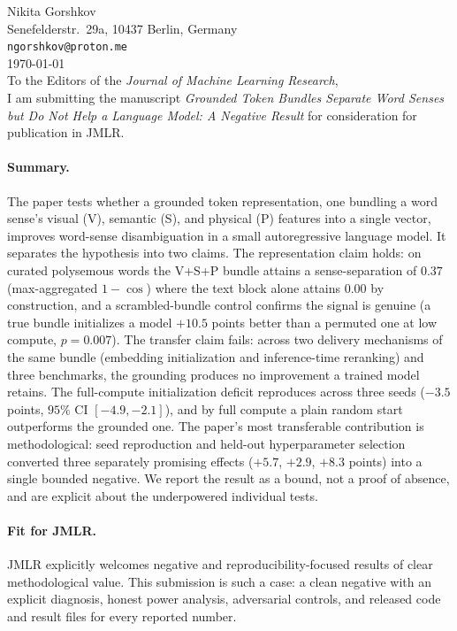 \documentclass[11pt]{article}
\begin{document}
\thispagestyle{empty}

\noindent Nikita Gorshkov\\
Senefelderstr.\ 29a, 10437 Berlin, Germany\\
\texttt{ngorshkov@proton.me}\\[1em]
\noindent\today\\[1em]

\noindent To the Editors of the \emph{Journal of Machine Learning Research},\\

I am submitting the manuscript \emph{Grounded Token Bundles Separate Word Senses
but Do Not Help a Language Model: A Negative Result} for consideration for
publication in JMLR.

\paragraph{Summary.}
The paper tests whether a grounded token representation, one bundling a word
sense's visual (V), semantic (S), and physical (P) features into a single vector,
improves word-sense disambiguation in a small autoregressive language model. It
separates the hypothesis into two claims. The representation claim holds: on
curated polysemous words the V+S+P bundle attains a sense-separation of $0.37$
(max-aggregated $1-\cos$) where the text block alone attains $0.00$ by
construction, and a scrambled-bundle control confirms the signal is genuine (a
true bundle initializes a model $+10.5$ points better than a permuted one at low
compute, $p = 0.007$). The transfer claim fails: across two delivery mechanisms
of the same bundle (embedding initialization and inference-time reranking) and
three benchmarks, the grounding produces no improvement a trained model retains.
The full-compute initialization deficit reproduces across three seeds ($-3.5$
points, $95\%$ CI $[-4.9, -2.1]$), and by full compute a plain random start
outperforms the grounded one. The paper's most transferable contribution is
methodological: seed reproduction and held-out hyperparameter selection converted
three separately promising effects ($+5.7$, $+2.9$, $+8.3$ points) into a single
bounded negative. We report the result as a bound, not a proof of absence, and are
explicit about the underpowered individual tests.

\paragraph{Fit for JMLR.}
JMLR explicitly welcomes negative and reproducibility-focused results of clear
methodological value. This submission is such a case: a clean negative with an
explicit diagnosis, honest power analysis, adversarial controls, and released
code and result files for every reported number.
\end{document}
